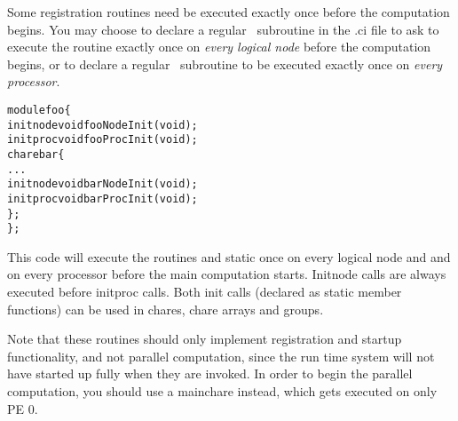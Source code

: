 
\label{initnode}
\label{initproc}
Some registration routines need be executed exactly once
before the computation begins. You may choose to 
declare a regular  \CC\ subroutine  in the .ci file
to ask \charmpp{} to execute the routine exactly once on {\em every logical node} 
before the computation begins, or to declare a regular  \CC\ subroutine 
 to be executed exactly once on {\em every processor}.

\begin{alltt}
module foo \{
    initnode void fooNodeInit(void);
    initproc void fooProcInit(void);
    chare bar \{
        ...
        initnode void barNodeInit(void);
        initproc void barProcInit(void);
    \};
\};
\end{alltt}

This code will execute the routines  and static 
 once on every logical node and 
and  on every processor before the main computation 
starts.
Initnode calls are always executed before initproc calls.
Both init calls (declared as static member functions) can be used in chares, 
chare arrays and groups.

Note that these routines should only implement registration and startup functionality, 
and not parallel computation, since
the \charmpp{} run time system will not have started up fully when they are invoked. 
In order to begin the parallel computation, you should 
use a mainchare instead, which gets executed on only PE 0.

